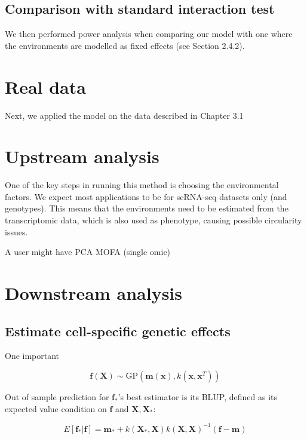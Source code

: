 \subsection{Comparison with standard interaction test}

We then performed power analysis when comparing our model with one where the environments are modelled as fixed effects (see Section 2.4.2).

\newpage

\section{Real data}

Next, we applied the model on the data described in Chapter 3.1

\section{Upstream analysis}

One of the key steps in running this method is choosing the environmental factors.
We expect most applications to be for scRNA-seq datasets only (and genotypes).
This means that the environments need to be estimated from the transcriptomic data, which is also used as phenotype, causing possible circularity issues.


A user might have 
PCA
MOFA (single omic)

\section{Downstream analysis} 

\subsection{Estimate cell-specific genetic effects}
One important 

\begin{equation}
    \mathbf{f}(\mathbf{X}) \sim \mathrm{GP}(\mathbf{m}(\mathbf{x}), k(\mathbf{x},\mathbf{x}^T))
\end{equation}

Out of sample prediction for $\mathbf{f}_*$'s best estimator is its BLUP, defined as its expected value condition on $\mathbf{f}$ and $\mathbf{X},\mathbf{X}_*$:

\begin{equation}
    E[\mathbf{f}_*|\mathbf{f}] = \mathbf{m}_* +k(\mathbf{X}_*,\mathbf{X})k(\mathbf{X},\mathbf{X})^{-1}(\mathbf{f}-\mathbf{m})
\end{equation}

